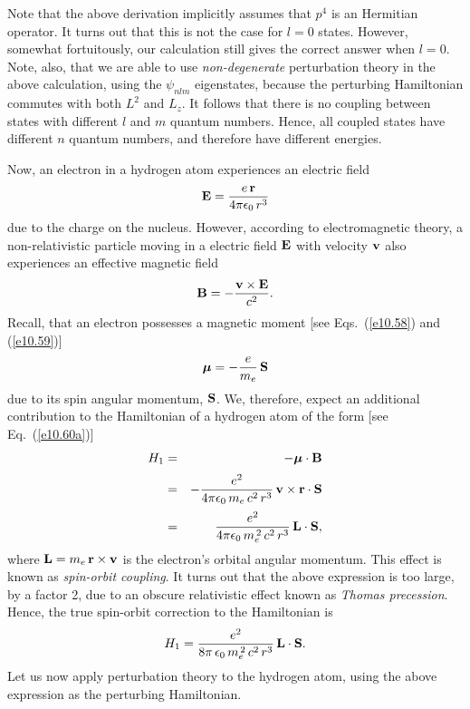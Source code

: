 Note that the above derivation implicitly assumes that $p^4$ is an Hermitian
operator. It turns out that this is not the case for $l=0$ states. However,
somewhat fortuitously, 
our calculation still gives the correct answer when $l=0$. Note, also,
that we are able to use {\em non-degenerate}\/ perturbation theory in the
above calculation, using the $\psi_{nlm}$ eigenstates, because the perturbing Hamiltonian commutes
with both $L^2$ and $L_z$. It follows that there is no
coupling between states with different $l$ and $m$ quantum numbers.
Hence, all coupled states have different $n$ quantum numbers, and
therefore have different energies.

Now, an electron in a hydrogen atom experiences an electric field
\begin{equation}
{\bf E} = \frac{e\,{\bf r}}{4\pi\epsilon_0\,r^3}
\end{equation}
due to the charge on the nucleus. However, according to
electromagnetic theory, a non-relativistic particle moving in a
electric field ${\bf E}$ with velocity ${\bf v}$ also experiences an effective
magnetic field
\begin{equation}\label{e12.124}
{\bf B} = -\frac{{\bf v}\times {\bf E}}{c^2}.
\end{equation}
Recall, that an electron possesses a magnetic moment [see Eqs.~(\ref{e10.58})
and (\ref{e10.59})]
\begin{equation}
\mbox{\boldmath$\mu$} = - \frac{e}{m_e}\,{\bf S}
\end{equation}
due to its spin angular momentum, ${\bf S}$. We, therefore, expect
an additional contribution to the Hamiltonian of a hydrogen atom of the form [see Eq.~(\ref{e10.60a})]
\begin{eqnarray}
H_1 &=& - \mbox{\boldmath$\mu$}\cdot {\bf B}\nonumber\\[0.5ex]
&=& - \frac{e^2}{4\pi\epsilon_0\,m_e\,c^2\,r^3}\,{\bf v}\times {\bf r}\cdot{\bf S}\nonumber\\[0.5ex]
&=& \frac{e^2}{4\pi\epsilon_0\,m_e^{\,2}\,c^2\,r^3}\,{\bf L}\cdot {\bf S},
\end{eqnarray}
where ${\bf L} = m_e\,{\bf r}\times {\bf v}$  is the electron's orbital angular momentum. This effect is known as {\em spin-orbit coupling}. It turns
out that the above expression is too large, by a factor 2, due to an
obscure relativistic effect known as {\em Thomas precession}. Hence, the true
spin-orbit correction to the Hamiltonian is
\begin{equation}\label{e12.127}
H_1 = \frac{e^2}{8\pi\,\epsilon_0\,m_e^{\,2}\,c^2\,r^3}\,{\bf L}\cdot {\bf S}.
\end{equation}
Let us now apply perturbation theory to the hydrogen atom, using the
above expression as the perturbing Hamiltonian.

